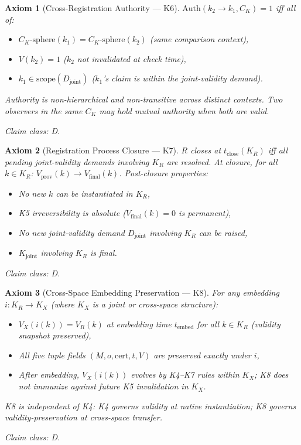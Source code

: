\documentclass[12pt,a4paper]{article}
\theoremstyle{plain}
\newtheorem{axiom}{Axiom}[section]
\theoremstyle{definition}
\theoremstyle{remark}
\newcommand{\KR}{K_{\!R}}
\newcommand{\Kjoint}{K_{\mathrm{joint}}}
\newcommand{\Vp}{V_{\mathrm{prov}}}
\newcommand{\Vf}{V_{\mathrm{final}}}
\newcommand{\CK}{C_K}
\newcommand{\tclose}{t_{\mathrm{close}}}
\newcommand{\Auth}{\mathrm{Auth}}
\begin{document}
\begin{axiom}[Cross-Registration Authority --- K6]\label{ax:K6}
$\Auth(k_2 \to k_1, \CK) = 1$ iff all of:
\begin{itemize}[noitemsep,topsep=2pt]
  \item[(a)] $\CK\text{-sphere}(k_1) = \CK\text{-sphere}(k_2)$
             \hfill(same comparison context),
  \item[(b)] $V(k_2) = 1$ \hfill($k_2$ not invalidated at check time),
  \item[(c)] $k_1 \in \mathrm{scope}(D_{\mathrm{joint}})$
             \hfill($k_1$'s claim is within the joint-validity demand).
\end{itemize}
Authority is non-hierarchical and non-transitive across distinct contexts.
Two observers in the same $\CK$ may hold mutual authority when both are
valid.

\smallskip
\noindent\textit{Claim class}: D.
\end{axiom}

\begin{axiom}[Registration Process Closure --- K7]\label{ax:K7}
$R$ closes at $\tclose(\KR)$ iff all pending joint-validity demands
involving $\KR$ are resolved. At closure, for all $k \in \KR$:
$\Vp(k) \to \Vf(k)$.
Post-closure properties:
\begin{itemize}[noitemsep,topsep=2pt]
  \item[(a)] No new $k$ can be instantiated in $\KR$,
  \item[(b)] K5 irreversibility is absolute ($\Vf(k) = 0$ is permanent),
  \item[(c)] No new joint-validity demand $D_{\mathrm{joint}}$ involving
             $\KR$ can be raised,
  \item[(d)] $\Kjoint$ involving $\KR$ is final.
\end{itemize}
\noindent\textit{Claim class}: D.
\end{axiom}

\begin{axiom}[Cross-Space Embedding Preservation --- K8]\label{ax:K8}
For any embedding $i\colon \KR \to K_X$ (where $K_X$ is a joint or
cross-space structure):
\begin{itemize}[noitemsep,topsep=2pt]
  \item[(i)]  $V_X(i(k)) = V_R(k)$ at embedding time $t_{\mathrm{embed}}$
              for all $k \in \KR$ (validity snapshot preserved),
  \item[(ii)] All five tuple fields $(M,o,\mathrm{cert},t,V)$ are
              preserved exactly under $i$,
  \item[(iii)] After embedding, $V_X(i(k))$ evolves by K4--K7 rules
               within $K_X$; K8 does not immunize against future K5
               invalidation in $K_X$.
\end{itemize}
K8 is independent of K4: K4 governs validity at native instantiation;
K8 governs validity-preservation at cross-space transfer.

\smallskip
\noindent\textit{Claim class}: D.
\end{axiom}
\end{document}
